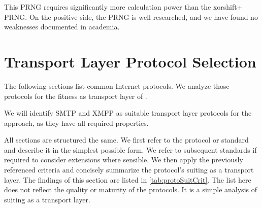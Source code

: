 This PRNG requires significantly more calculation power than the xorshift+ PRNG. On the positive side, the PRNG is well researched, and we have found no weaknesses documented in academia.


\section{Transport Layer Protocol Selection}\label{sec:transportProtocols}
The following sections list common Internet protocols. We analyze those protocols for the fitness as transport layer of \MessageVortex. 

We will identify SMTP and XMPP as suitable transport layer protocols for the \MessageVortex{} approach, as they have all required properties.

All sections are structured the same. We first refer to the protocol or standard and describe it in the simplest possible form. We refer to subsequent standards if required to consider extensions where sensible. We then apply the previously referenced criteria and concisely summarize the protocol's suiting as a transport layer. The findings of this section are listed in \cref{tab:protoSuitCrit}. The list here does not reflect the quality or maturity of the protocols. It is a simple analysis of suiting as a transport layer.

